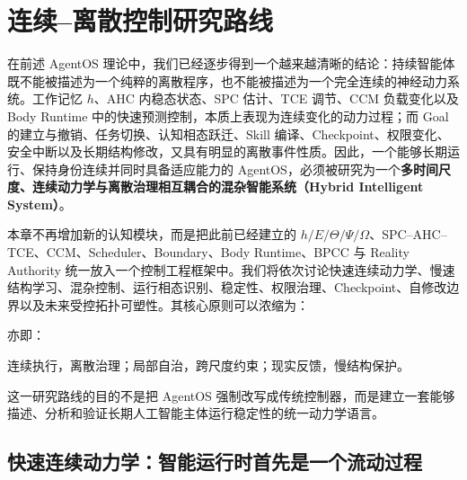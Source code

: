 \chapter{连续--离散控制研究路线}

\begin{chapterlead}
在前述 AgentOS 理论中，我们已经逐步得到一个越来越清晰的结论：持续智能体既不能被描述为一个纯粹的离散程序，也不能被描述为一个完全连续的神经动力系统。工作记忆 $h$、AHC 内稳态状态、SPC 估计、TCE 调节、CCM 负载变化以及 Body Runtime 中的快速预测控制，本质上表现为连续变化的动力过程；而 Goal 的建立与撤销、任务切换、认知相态跃迁、Skill 编译、Checkpoint、权限变化、安全中断以及长期结构修改，又具有明显的离散事件性质。因此，一个能够长期运行、保持身份连续并同时具备适应能力的 AgentOS，必须被研究为一个\textbf{多时间尺度、连续动力学与离散治理相互耦合的混杂智能系统（Hybrid Intelligent System）}。

本章不再增加新的认知模块，而是把此前已经建立的 $h/E/\Theta/\Psi/\Omega$、SPC--AHC--TCE、CCM、Scheduler、Boundary、Body Runtime、BPCC 与 Reality Authority 统一放入一个控制工程框架中。我们将依次讨论快速连续动力学、慢速结构学习、混杂控制、运行相态识别、稳定性、权限治理、Checkpoint、自修改边界以及未来受控拓扑可塑性。其核心原则可以浓缩为：
\begin{statementbox}
\centering
{}
\end{statementbox}
亦即：
\begin{statementbox}
连续执行，离散治理；局部自治，跨尺度约束；现实反馈，慢结构保护。
\end{statementbox}
这一研究路线的目的不是把 AgentOS 强制改写成传统控制器，而是建立一套能够描述、分析和验证长期人工智能主体运行稳定性的统一动力学语言。
\end{chapterlead}


\section{快速连续动力学：智能运行时首先是一个流动过程}

